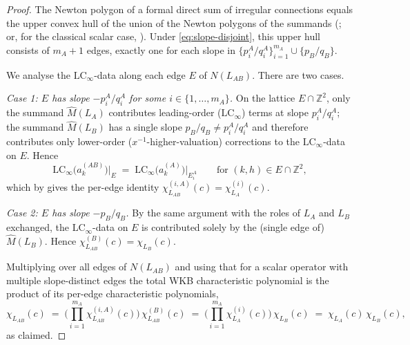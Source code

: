 \documentclass[aip,jmp,preprint,amsmath,amssymb,nofootinbib,floatfix]{revtex4-2}
\theoremstyle{plain}
\theoremstyle{definition}
\theoremstyle{remark}
\newcommand{\LCinf}{\mathrm{LC}_\infty}
\begin{document}
\begin{proof}
The Newton polygon of a formal direct sum of irregular connections
equals the upper convex hull of the union of the Newton polygons of the
summands (\cite[Ch.~III, \S 1]{sabbah-isomon}; or, for the classical
scalar case, \cite[Ch.~II]{robba-malgrange}). Under
\eqref{eq:slope-disjoint}, this upper hull consists of $m_A + 1$ edges,
exactly one for each slope in $\{p_i^A/q_i^A\}_{i=1}^{m_A} \cup
\{p_B/q_B\}$.

We analyse the $\LCinf$-data along each edge $E$ of $N(L_{AB})$. There
are two cases.

\smallskip
\textit{Case 1: $E$ has slope $-p_i^A/q_i^A$ for some
$i \in \{1, \dots, m_A\}$.}
On the lattice $E \cap \mathbb{Z}^2$, only the summand $\widehat M(L_A)$
contributes leading-order ($\LCinf$) terms at slope $p_i^A/q_i^A$;
the summand $\widehat M(L_B)$ has a single slope $p_B/q_B \ne p_i^A/q_i^A$
and therefore contributes only lower-order ($x^{-1}$-higher-valuation)
corrections to the $\LCinf$-data on $E$. Hence
\[
   \LCinf\!\big(a_k^{(AB)}\big)\big|_{E}
   \;=\;
   \LCinf\!\big(a_k^{(A)}\big)\big|_{E_i^A}
   \qquad \text{for } (k, h) \in E \cap \mathbb{Z}^2,
\]
which by  gives the per-edge identity
$\chi^{(i,A)}_{L_{AB}}(c) = \chi^{(i)}_{L_A}(c)$.

\smallskip
\textit{Case 2: $E$ has slope $-p_B/q_B$.}
By the same argument with the roles of $L_A$ and $L_B$ exchanged, the
$\LCinf$-data on $E$ is contributed solely by the (single edge of)
$\widehat M(L_B)$. Hence
$\chi^{(B)}_{L_{AB}}(c) = \chi_{L_B}(c)$.

\smallskip
Multiplying over all edges of $N(L_{AB})$ and using that for a scalar
operator with multiple slope-distinct edges the total WKB characteristic
polynomial is the product of its per-edge characteristic polynomials,
\[
   \chi_{L_{AB}}(c)
   \;=\;
   \Big(\prod_{i=1}^{m_A} \chi^{(i,A)}_{L_{AB}}(c)\Big)\,
   \chi^{(B)}_{L_{AB}}(c)
   \;=\;
   \Big(\prod_{i=1}^{m_A} \chi^{(i)}_{L_A}(c)\Big)\,
   \chi_{L_B}(c)
   \;=\;
   \chi_{L_A}(c)\, \chi_{L_B}(c),
\]
as claimed.
\end{proof}
\end{document}
